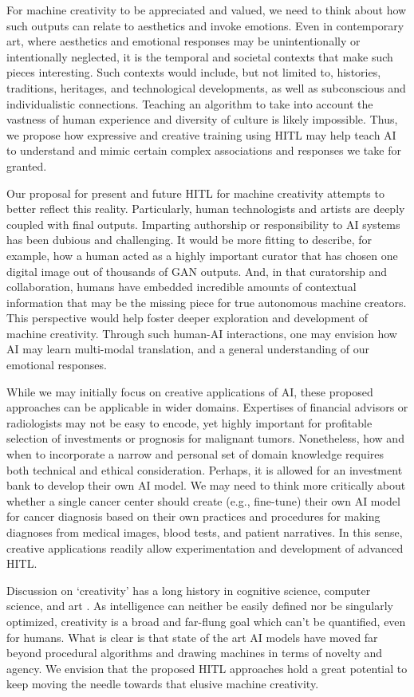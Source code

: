 \documentclass[letterpaper]{article} %
\begin{document}
For machine creativity to be appreciated and valued, we need to think about how such outputs can relate to aesthetics and invoke emotions. Even in contemporary art, where aesthetics and emotional responses may be unintentionally or intentionally neglected, it is the temporal and societal contexts that make such pieces interesting. Such contexts would include, but not limited to, histories, traditions, heritages, and technological developments, as well as subconscious and individualistic connections. Teaching an algorithm to take into account the vastness of human experience and diversity of culture is likely impossible. Thus, we propose how expressive and creative training using HITL may help teach AI to understand and mimic certain complex associations and responses we take for granted.

Our proposal for present and future HITL for machine creativity attempts to better reflect this reality. Particularly, human technologists and artists are deeply coupled with final outputs. Imparting authorship or responsibility to AI systems has been dubious and challenging. It would be more fitting to describe, for example, how a human acted as a highly important curator that has chosen one digital image out of thousands of GAN outputs. And, in that curatorship and collaboration, humans have embedded incredible amounts of contextual information that may be the missing piece for true autonomous machine creators. This perspective would help foster deeper exploration and development of machine creativity. Through such human-AI interactions, one may envision how AI may learn multi-modal translation, and a general understanding of our emotional responses.

While we may initially focus on creative applications of AI, these proposed approaches can be applicable in wider domains. Expertises of financial advisors or radiologists may not be easy to encode, yet highly important for profitable selection of investments or prognosis for malignant tumors. Nonetheless, how and when to incorporate a narrow and personal set of domain knowledge requires both technical and ethical consideration. Perhaps, it is allowed for an investment bank to develop their own AI model. We may need to think more critically about whether a single cancer center should create (e.g., fine-tune) their own AI model for cancer diagnosis based on their own practices and procedures for making diagnoses from medical images, blood tests, and patient narratives. In this sense, creative applications readily allow experimentation and development of advanced HITL.

Discussion on `creativity' has a long history in cognitive science, computer science, and art \cite[e.g.,][]{Cohen1979, Wilson1983, Boden1996, Nake1998}. As intelligence can neither be easily defined nor be singularly optimized, creativity is a broad and far-flung goal which can't be quantified, even for humans. What is clear is that state of the art AI models have moved far beyond procedural algorithms and drawing machines in terms of novelty and agency. We envision that the proposed HITL approaches hold a great potential to keep moving the needle towards that elusive machine creativity.


\end{document}

